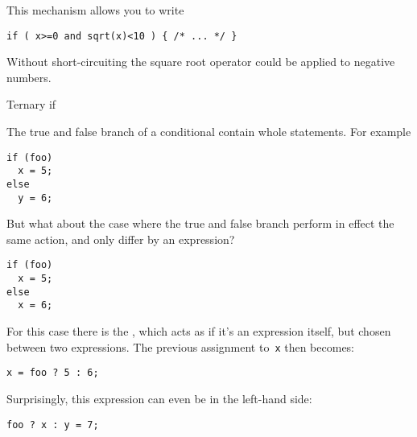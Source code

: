 This mechanism allows you to write
\begin{lstlisting}
if ( x>=0 and sqrt(x)<10 ) { /* ... */ }
\end{lstlisting}
Without short-circuiting the square root operator could be applied to
negative numbers.

 {Ternary if}

The true and false branch of a conditional contain whole statements.
For example
\begin{lstlisting}
if (foo)
  x = 5;
else
  y = 6;
\end{lstlisting}
But what about the case where the true and false branch perform
in effect the same action, and only differ by an expression?
\begin{lstlisting}
if (foo)
  x = 5;
else
  x = 6;
\end{lstlisting}
For this case there is the ,
which acts as if it's an expression itself, but chosen
between two expressions.
The previous assignment to~\lstinline{x} then becomes:
\begin{lstlisting}
x = foo ? 5 : 6;
\end{lstlisting}
Surprisingly, this expression can even be in the left-hand side:
\begin{lstlisting}
foo ? x : y = 7;
\end{lstlisting}

\begin{comment}
\Level 1 {Init statements}

The \cppstandard{17} introduced a new form of the \indextermtt{if} and
\indextermtt{switch} statement: it is possible to have a single
statement of declaration prior to the test.

\snippetwithoutput{ifinitchar}{basic}{ifinit}

This is particularly elegant if the init statement is a declaration,
because the declared variable is then local to the
conditional. Previously one would have had to write
\begin{lstlisting}
char c;
c = getchar();
if ( c!='a' ) /* ... */
\end{lstlisting}
with the variable globally defined.
\end{comment}
